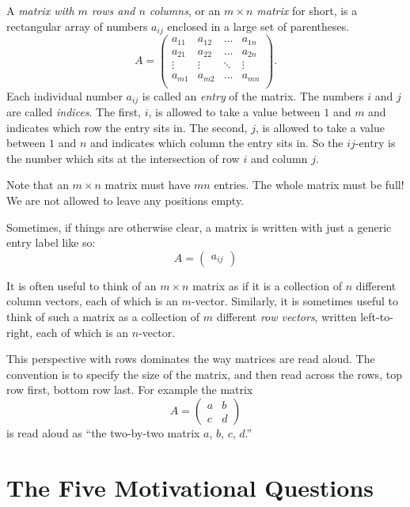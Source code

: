 \documentclass[00-livre-main.tex]{subfiles}
\begin{document}
\begin{definition}
A \emph{matrix with $m$ rows and $n$ columns}, or an \emph{$m\times n$ matrix} for short, is a rectangular array of numbers $a_{ij}$ enclosed in a large set of parentheses. \[
A = \begin{pmatrix}
a_{11} & a_{12} & \dots & a_{1n}\\
a_{21} & a_{22} & \dots & a_{2n}\\
\vdots & \vdots & \ddots & \vdots \\
a_{m1} & a_{m2} & \dots & a_{mn}\\
\end{pmatrix} .
\]
Each individual number $a_{ij}$ is called an \emph{entry} of the matrix. The numbers $i$ and $j$ are called \emph{indices}. The first, $i$, is allowed to take a value between $1$ and $m$ and indicates which row the entry sits in. The second, $j$, is allowed to take a value between $1$ and $n$ and indicates which column the entry sits in. So the $ij$-entry is the number which sits at the intersection of row $i$ and column $j$.


Note that an $m\times n$ matrix must have $mn$ entries. The whole matrix must be full! We are not allowed to leave any positions empty.

Sometimes, if things are otherwise clear, a matrix is written with just a generic entry label like so:
\[
A = \begin{pmatrix} a_{ij} \end{pmatrix}
\]
\end{definition}

It is often useful to think of an $m\times n$ matrix as if it is a collection of $n$ different column vectors, each of which is an $m$-vector. Similarly, it is sometimes useful to think of such a matrix as a collection of $m$ different \emph{row vectors}, written left-to-right, each of which is an $n$-vector.

This perspective with rows dominates the way matrices are read aloud. The convention is to specify the size of the matrix, and then read across the rows, top row first, bottom row last. For example the matrix
\[
A = \begin{pmatrix} a & b \\ c & d \end{pmatrix}
\]
is read aloud as ``the two-by-two matrix $a$, $b$, $c$, $d$.''

\section{The Five Motivational Questions}
\end{document}
